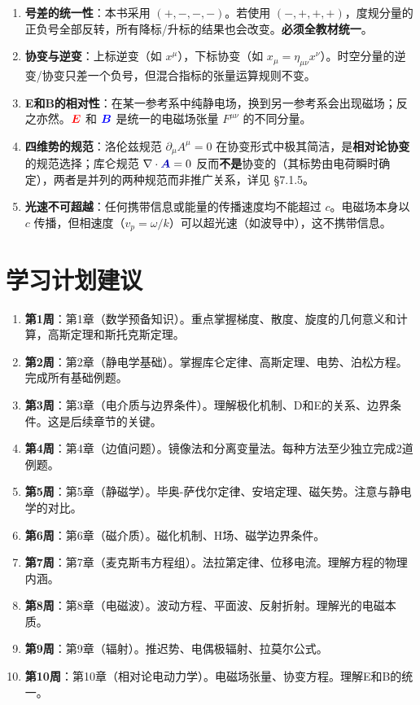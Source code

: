 \documentclass[11pt,a4paper,openany,oneside]{book}
\newcommand{\vecE}{\textcolor{red}{\vect{E}}}
\newcommand{\vecB}{\textcolor{blue}{\vect{B}}}
\newcommand{\vecA}{\textcolor{blue!70!black}{\vect{A}}}
\newcommand{\vect}[1]{\bm{#1}}
\begin{document}
\begin{enumerate}
\item \textbf{号差的统一性}：本书采用 $(+,-,-,-)$。若使用 $(-,+,+,+)$，度规分量的正负号全部反转，所有降标/升标的结果也会改变。\textbf{必须全教材统一}。
\item \textbf{协变与逆变}：上标逆变（如 $x^\mu$），下标协变（如 $x_\mu=\eta_{\mu\nu}x^\nu$）。时空分量的逆变/协变只差一个负号，但混合指标的张量运算规则不变。
\item \textbf{E和B的相对性}：在某一参考系中纯静电场，换到另一参考系会出现磁场；反之亦然。$\vecE$ 和 $\vecB$ 是统一的电磁场张量 $F^{\mu\nu}$ 的不同分量。
\item \textbf{四维势的规范}：洛伦兹规范 $\partial_\mu A^\mu=0$ 在协变形式中极其简洁，是\textbf{相对论协变}的规范选择；库仑规范 $\nabla\cdot\vecA=0$ 反而\textbf{不是}协变的（其标势由电荷瞬时确定），两者是并列的两种规范而非推广关系，详见 §7.1.5。
\item \textbf{光速不可超越}：任何携带信息或能量的传播速度均不能超过 $c$。电磁场本身以 $c$ 传播，但相速度（$v_p=\omega/k$）可以超光速（如波导中），这不携带信息。
\end{enumerate}


\chapter{学习计划建议}

\begin{enumerate}
\item \textbf{第1周}：第1章（数学预备知识）。重点掌握梯度、散度、旋度的几何意义和计算，高斯定理和斯托克斯定理。
\item \textbf{第2周}：第2章（静电学基础）。掌握库仑定律、高斯定理、电势、泊松方程。完成所有基础例题。
\item \textbf{第3周}：第3章（电介质与边界条件）。理解极化机制、D和E的关系、边界条件。这是后续章节的关键。
\item \textbf{第4周}：第4章（边值问题）。镜像法和分离变量法。每种方法至少独立完成2道例题。
\item \textbf{第5周}：第5章（静磁学）。毕奥-萨伐尔定律、安培定理、磁矢势。注意与静电学的对比。
\item \textbf{第6周}：第6章（磁介质）。磁化机制、H场、磁学边界条件。
\item \textbf{第7周}：第7章（麦克斯韦方程组）。法拉第定律、位移电流。理解方程的物理内涵。
\item \textbf{第8周}：第8章（电磁波）。波动方程、平面波、反射折射。理解光的电磁本质。
\item \textbf{第9周}：第9章（辐射）。推迟势、电偶极辐射、拉莫尔公式。
\item \textbf{第10周}：第10章（相对论电动力学）。电磁场张量、协变方程。理解E和B的统一。
\end{enumerate}
\end{document}
